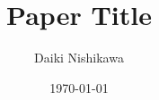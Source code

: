 \documentclass[dvipdfmx,11pt,a4paper,onecolumn,oneside]{article}
\begin{document}
\title{Paper Title}
\author{Daiki Nishikawa}
\date{\today}
\maketitle






\printbibliography[heading=bibintoc]
\end{document}

